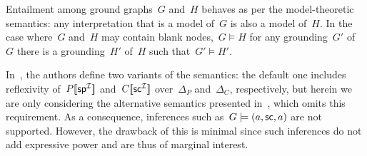 \nd Entailment among ground graphs~$G$ and~$H$ behaves as per the model-theoretic semantics: any interpretation that is
a model of~$G$ is also a model of~$H$.
%
In the case where~$G$ and~$H$ may contain blank nodes,~$G \models H$ \iff for any grounding~$G'$ of~$G$ there is a
grounding~$H'$ of~$H$ such that~$G' \models H'$.
%

In~\citet{MunozPerezGutierrez:2007aa}, the authors define two variants of the semantics: the default one includes
reflexivity of~${P[\![{ \mathsf{sp}}^{\mathcal{I}}]\!]}$ and~${C[\![{\mathsf{sc}}^{\mathcal{I}}]\!]}$ over~$\Delta_{P}$ and~$\Delta_{C}$, respectively, but
herein we are only considering the alternative semantics presented in~\citet[Definition 4]{MunozPerezGutierrez:2007aa},
which omits this requirement.
% 
As a consequence, inferences such as~$G \models (a, \mathsf{sc}, a)$ are not supported.  However, the drawback of
this is minimal since such inferences do not add expressive power and are thus of marginal interest.
%


